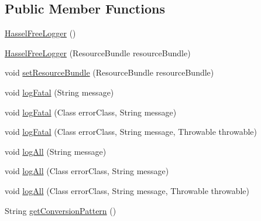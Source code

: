 \subsection*{Public Member Functions}
\begin{DoxyCompactItemize}
\item 
\mbox{\hyperlink{classnet_1_1dlinkddns_1_1atulsaurabh_1_1hasselfreelogger_1_1impl_1_1_hassel_free_logger_a603e83e38bc2c011dd3e5edf074acb1d}{Hassel\+Free\+Logger}} ()
\item 
\mbox{\hyperlink{classnet_1_1dlinkddns_1_1atulsaurabh_1_1hasselfreelogger_1_1impl_1_1_hassel_free_logger_ab9b2ead8ea2edef8f1c1f0081b38e882}{Hassel\+Free\+Logger}} (Resource\+Bundle resource\+Bundle)
\item 
void \mbox{\hyperlink{classnet_1_1dlinkddns_1_1atulsaurabh_1_1hasselfreelogger_1_1impl_1_1_hassel_free_logger_a33f376ecfd8258b672cdfb93514c14b0}{set\+Resource\+Bundle}} (Resource\+Bundle resource\+Bundle)
\item 
void \mbox{\hyperlink{classnet_1_1dlinkddns_1_1atulsaurabh_1_1hasselfreelogger_1_1impl_1_1_hassel_free_logger_a478d877ebdbb5cb2796ad23d0dafe369}{log\+Fatal}} (String message)
\item 
void \mbox{\hyperlink{classnet_1_1dlinkddns_1_1atulsaurabh_1_1hasselfreelogger_1_1impl_1_1_hassel_free_logger_a40d4e893854bc742145dbf2fe5d2aa43}{log\+Fatal}} (Class error\+Class, String message)
\item 
void \mbox{\hyperlink{classnet_1_1dlinkddns_1_1atulsaurabh_1_1hasselfreelogger_1_1impl_1_1_hassel_free_logger_a546bc74e8eec8333893e294a98bbe939}{log\+Fatal}} (Class error\+Class, String message, Throwable throwable)
\item 
void \mbox{\hyperlink{classnet_1_1dlinkddns_1_1atulsaurabh_1_1hasselfreelogger_1_1impl_1_1_hassel_free_logger_af433939b275c708e5334f56a6444e2af}{log\+All}} (String message)
\item 
void \mbox{\hyperlink{classnet_1_1dlinkddns_1_1atulsaurabh_1_1hasselfreelogger_1_1impl_1_1_hassel_free_logger_ade5a00300f3406a3a64ca003b1799dbd}{log\+All}} (Class error\+Class, String message)
\item 
void \mbox{\hyperlink{classnet_1_1dlinkddns_1_1atulsaurabh_1_1hasselfreelogger_1_1impl_1_1_hassel_free_logger_a6b63592b0c825713f2bc861b6d487df8}{log\+All}} (Class error\+Class, String message, Throwable throwable)
\item 
String \mbox{\hyperlink{classnet_1_1dlinkddns_1_1atulsaurabh_1_1hasselfreelogger_1_1impl_1_1_hassel_free_logger_a8309e8b9abe877ce11e6b04faf48e8c1}{get\+Conversion\+Pattern}} ()

\end{DoxyCompactItemize}
